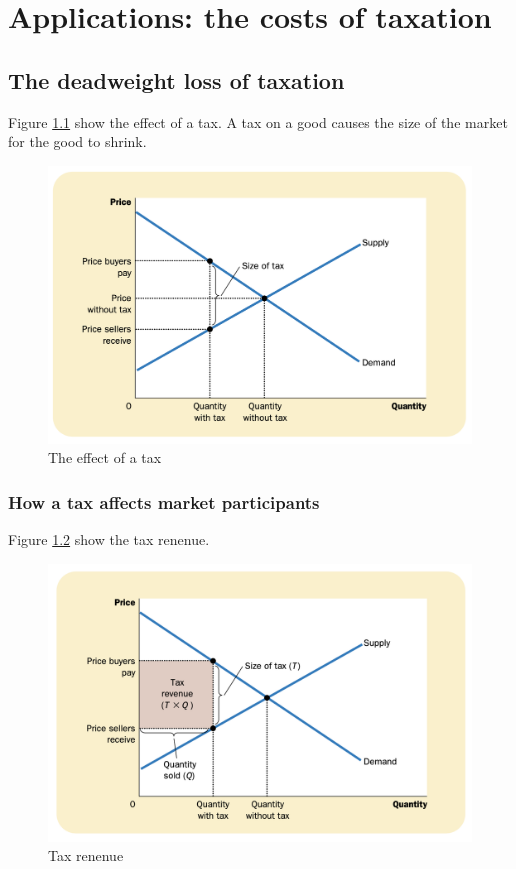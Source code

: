 
\chapter{Applications: the costs of taxation}

\section{The deadweight loss of taxation}

Figure \ref{fig:the-effect-of-a-tax} show the effect of a tax.
A tax on a good causes the size of the market for the good to shrink.

\begin{figure}[!ht]
  \centering
  \includegraphics[width=\textwidth]{pics/the-effect-of-a-tax}
  \caption{The effect of a tax}
  \label{fig:the-effect-of-a-tax}
\end{figure}


\subsection{How a tax affects market participants}

Figure \ref{fig:tax-revenue} show the tax renenue.

\begin{figure}[!ht]
  \centering
  \includegraphics[width=\textwidth]{pics/tax-revenue}
  \caption{Tax renenue}
  \label{fig:tax-revenue}
\end{figure}





